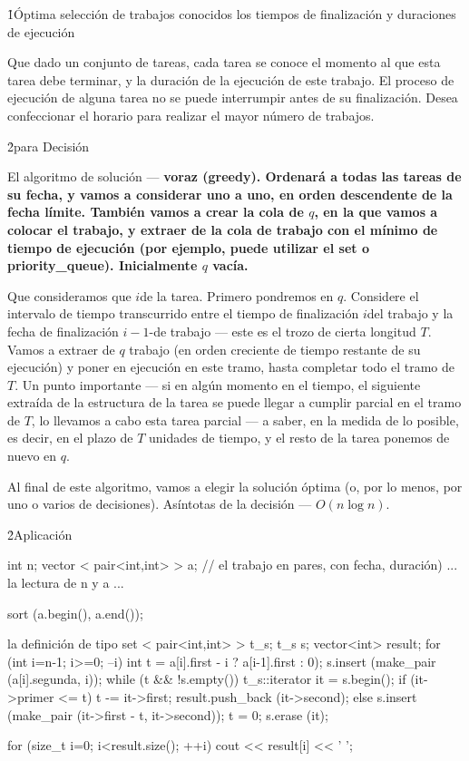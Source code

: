 \h1{Óptima selección de trabajos conocidos los tiempos de finalización y duraciones de ejecución}

Que dado un conjunto de tareas, cada tarea se conoce el momento al que esta tarea debe terminar, y la duración de la ejecución de este trabajo. El proceso de ejecución de alguna tarea no se puede interrumpir antes de su finalización. Desea confeccionar el horario para realizar el mayor número de trabajos.

\h2{para Decisión}

El algoritmo de solución --- \bf{voraz} (greedy). Ordenará a todas las tareas de su fecha, y vamos a considerar uno a uno, en orden descendente de la fecha límite. También vamos a crear la cola de $q$, en la que vamos a colocar el trabajo, y extraer de la cola de trabajo con el mínimo de tiempo de ejecución (por ejemplo, puede utilizar el set o priority_queue). Inicialmente $q$ vacía.

Que consideramos que $i$de la tarea. Primero pondremos en $q$. Considere el intervalo de tiempo transcurrido entre el tiempo de finalización $i$del trabajo y la fecha de finalización $i-1$-de trabajo --- este es el trozo de cierta longitud $T$. Vamos a extraer de $q$ trabajo (en orden creciente de tiempo restante de su ejecución) y poner en ejecución en este tramo, hasta completar todo el tramo de $T$. Un punto importante --- si en algún momento en el tiempo, el siguiente extraída de la estructura de la tarea se puede llegar a cumplir parcial en el tramo de $T$, lo llevamos a cabo esta tarea parcial --- a saber, en la medida de lo posible, es decir, en el plazo de $T$ unidades de tiempo, y el resto de la tarea ponemos de nuevo en $q$.

Al final de este algoritmo, vamos a elegir la solución óptima (o, por lo menos, por uno o varios de decisiones). Asíntotas de la decisión --- $O (n \log n)$.


\h2{Aplicación}


\code
int n;
vector < pair<int,int> > a; // el trabajo en pares, con fecha, duración)
... la lectura de n y a ...

sort (a.begin(), a.end());

la definición de tipo set < pair<int,int> > t_s;
t_s s;
vector<int> result;
for (int i=n-1; i>=0; --i) {
int t = a[i].first - i ? a[i-1].first : 0);
s.insert (make_pair (a[i].segunda, i));
while (t && !s.empty()) {
t_s::iterator it = s.begin();
if (it->primer <= t) {
t -= it->first;
result.push_back (it->second);
}
else {
s.insert (make_pair (it->first - t, it->second));
t = 0;
}
s.erase (it);
}
}

for (size_t i=0; i<result.size(); ++i)
cout << result[i] << ' ';
\endcode
